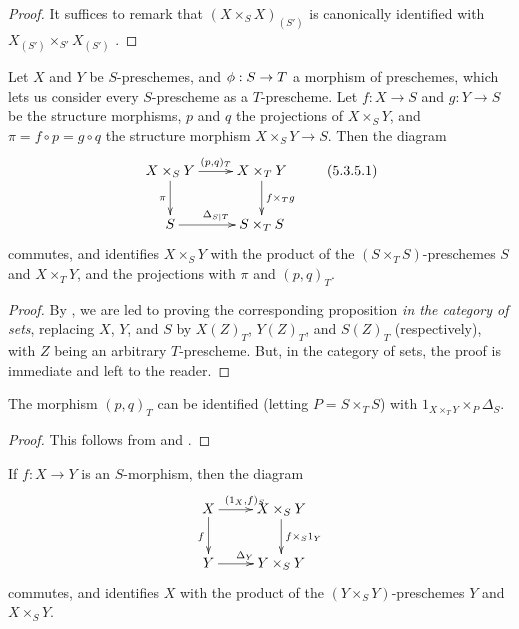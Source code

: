 \begin{proof}
\label{proof-1.5.3.4}
It suffices to remark that $(X\times_S X)_{(S')}$ is canonically identified with $X_{(S')}\times_{S'}X_{(S')}$ .
\end{proof}

\begin{proposition}[5.3.5]
\label{1.5.3.5}
Let $X$ and $Y$ be $S$-preschemes, and $\vphi:S\to T$ a morphism of preschemes, which lets us consider every $S$-prescheme as a $T$-prescheme.
Let $f:X\to S$ and $g:Y\to S$ be the structure morphisms, $p$ and $q$ the projections of $X\times_S Y$, and $\pi=f\circ p=g\circ q$ the structure morphism $X\times_S Y\to S$.
Then the diagram
\[
  \xymatrix{
    X\times_S Y\ar[r]^{(p,q)_T}\ar[d]_\pi &
    X\times_T Y\ar[d]^{f\times_T g}\\
    S\ar[r]^{\Delta_{S|T}} &
    S\times_T S
  }
  \tag{5.3.5.1}
\]
commutes, and identifies $X\times_S Y$ with the product of the $(S\times_T S)$-preschemes $S$ and $X\times_T Y$, and the projections with $\pi$ and $(p,q)_T$.
\end{proposition}

\begin{proof}
\label{proof-1.5.3.5}
By , we are led to proving the corresponding proposition \emph{in the category of sets}, replacing $X$, $Y$, and $S$ by $X(Z)_T$, $Y(Z)_T$, and $S(Z)_T$ (respectively), with $Z$ being an arbitrary $T$-prescheme.
But, in the category of sets, the proof is immediate and left to the reader.
\end{proof}

\begin{corollary}[5.3.6]
\label{1.5.3.6}
The morphism $(p,q)_T$ can be identified (letting $P=S\times_T S$) with $1_{X\times_T Y}\times_P\Delta_S$.
\end{corollary}

\begin{proof}
\label{proof-1.5.3.6}
This follows from  and .
\end{proof}

\begin{corollary}[5.3.7]
\label{1.5.3.7}
If $f:X\to Y$ is an $S$-morphism, then the diagram
\[
  \xymatrix{
    X\ar[r]^{(1_X,f)_S}\ar[d]_f &
    X\times_S Y\ar[d]^{f\times_S 1_Y}\\
    Y\ar[r]^{\Delta_Y} &
    Y\times_S Y
  }
\]
commutes, and identifies $X$ with the product of the $(Y\times_S Y)$-preschemes $Y$ and $X\times_S Y$.
\end{corollary}

